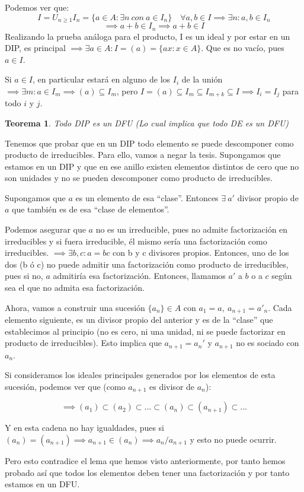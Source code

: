 \documentclass[11pt, a4paper, titlepage]{article}
\makeatletter
\newif\IfInSansMode
\let\oldsf\sffamily
\renewcommand*{\sffamily}{\oldsf\mathversion{sans}\InSansModetrue}
\let\oldnorm\normalfont
\renewcommand*{\normalfont}{\oldnorm\InSansModefalse\mathversion{normal}}
\renewenvironment{proof}[1][\proofname] {\vspace{-15pt}\par\pushQED{\qed}\normalfont\topsep6\p@\@plus6\p@\relax\trivlist\item[\hskip\labelsep\it#1\@addpunct{.}]\ignorespaces}{\popQED\endtrivlist\@endpefalse}
\renewenvironment{proof}[1][\proofname] {\par\pushQED{\qed}\normalfont\topsep6\p@\@plus6\p@\relax\trivlist\item[\hskip\labelsep\itshape\sffamily#1\@addpunct{.}]\ignorespaces}{\popQED\endtrivlist\@endpefalse}
\theoremstyle{theorem-style}
\newtheorem{nth}{Teorema}[section]
\theoremstyle{definition-style}
\theoremstyle{remark-style}
\theoremstyle{example-style}
\makeatother
\begin{document}
	\begin{proof}[Demostración del lema.]
	Podemos ver que:
	\[
	I = U_{n\geq 1} I_n = \{a \in A : \exists n \ con \ a \in I_n\} \quad \forall a,b \in I \implies \exists n: a,b \in I_n\]\[ \implies a+b \in I_n \implies a+b \in I
	\]
	Realizando la prueba análoga para el producto, I es un ideal y por estar en un DIP, es principal $\implies \exists a \in A : I = (a) = \{ax : x \in A\}$. Que es no vacío, pues $a \in I$.

	Si $a\in I$, en particular estará en alguno de los $I_i$ de la unión $\implies \exists m : a \in I_m \implies (a) \subseteq I_m$, pero  $I = (a) \subseteq I_m \subseteq I_{m+k} \subseteq I \implies I_i = I_j$ para todo $i$ y $j$.

\end{proof}

\begin{nth}
	Todo DIP es un DFU (Lo cual implica que todo DE es un DFU)
\end{nth}
\begin{proof}
	Tenemos que probar que en un DIP todo elemento se puede descomponer como producto de irreducibles. Para ello, vamos a negar la tesis. Supongamos que estamos en un DIP y que en ese anillo existen elementos distintos de cero que no son unidades y no se pueden descomponer como producto de irreducibles.

	Supongamos que $a$ es un elemento de esa “clase”. Entonces $\exists  \ a'$ divisor propio de $a$ que también es de esa “clase de elementos”.

	Podemos asegurar que $a$ no es un irreducible, pues no admite factorización en irreducibles y si fuera irreducible, él mismo sería una factorización como irreducibles. $\implies \exists b,c : a = bc$ con b y c divisores propios. Entonces, uno de los dos (b ó c) no puede admitir una factorización como producto de irreducibles, pues si no, $a$ admitiría esa factorización. Entonces, llamamos $a'$ a $b$ o a $c$ según sea el que no admita esa factorización.

	Ahora, vamos a construir una sucesión $\{a_n\} \in A$ con $a_1 = a,\ a_{n+1}=a'_n$. Cada elemento siguiente, es un divisor propio del anterior y es de la “clase” que establecimos al principio (no es cero, ni una unidad, ni se puede factorizar en producto de irreducibles). Esto implica que $a_{n+1} = a_n'$ y $a_{n+1}$ no es sociado con $a_n$.

	Si consideramos los ideales principales generados por los elementos de esta sucesión, podemos ver que (como $a_{n+1}$ es divisor de $a_n$):

	\[
	\implies (a_1) \subset (a_2) \subset ... \subset (a_n) \subset (a_{n+1}) \subset ...	\]

	Y en esta cadena no hay igualdades, pues si $(a_n) = (a_{n+1}) \implies a_{n+1} \in (a_n) \implies a_n/ a_{n+1}$ y esto no puede ocurrir.

	Pero esto contradice el lema que hemos visto anteriormente, por tanto hemos probado así que todos los elementos deben tener una factorización y por tanto estamos en un DFU.
\end{proof}
\end{document}
